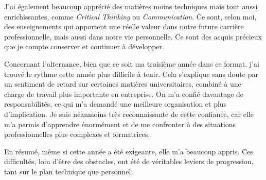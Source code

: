 J’ai également beaucoup apprécié des matières moins techniques mais tout aussi enrichissantes, comme \textit{Critical Thinking} ou \textit{Communication}. Ce sont, selon moi, des enseignements qui apportent une réelle valeur dans notre future carrière professionnelle, mais aussi dans notre vie personnelle. Ce sont des acquis précieux que je compte conserver et continuer à développer.

Concernant l’alternance, bien que ce soit ma troisième année dans ce format, j’ai trouvé le rythme cette année plus difficile à tenir. Cela s’explique sans doute par un sentiment de retard sur certaines matières universitaires, combiné à une charge de travail plus importante en entreprise. On m’a confié davantage de responsabilités, ce qui m’a demandé une meilleure organisation et plus d’implication. Je suis néanmoins très reconnaissante de cette confiance, car elle m’a permis d’apprendre énormément et de me confronter à des situations professionnelles plus complexes et formatrices.

En résumé, même si cette année a été exigeante, elle m’a beaucoup appris. Ces difficultés, loin d’être des obstacles, ont été de véritables leviers de progression, tant sur le plan technique que personnel.

